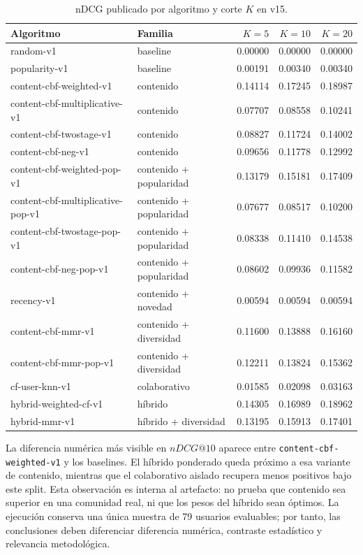 \begin{table}[htbp]
\centering
\caption{nDCG publicado por algoritmo y corte $K$ en v15.}\label{tab:ndcg-todos-k}
\tablecompact
\begin{tabularx}{\textwidth}{@{}>{\ttfamily\raggedright\arraybackslash}p{}Yrrr@{}}
\textnormal{Algoritmo} & \textnormal{Familia} & \textnormal{$K=5$} & \textnormal{$K=10$} & \textnormal{$K=20$} \\
\hline
random-v1 & baseline & 0.00000 & 0.00000 & 0.00000 \\
popularity-v1 & baseline & 0.00191 & 0.00340 & 0.00340 \\
content-cbf-weighted-v1 & contenido & 0.14114 & 0.17245 & 0.18987 \\
content-cbf-multiplicative-v1 & contenido & 0.07707 & 0.08558 & 0.10241 \\
content-cbf-twostage-v1 & contenido & 0.08827 & 0.11724 & 0.14002 \\
content-cbf-neg-v1 & contenido & 0.09656 & 0.11778 & 0.12992 \\
content-cbf-weighted-pop-v1 & contenido + popularidad & 0.13179 & 0.15181 & 0.17409 \\
content-cbf-multiplicative-pop-v1 & contenido + popularidad & 0.07677 & 0.08517 & 0.10200 \\
content-cbf-twostage-pop-v1 & contenido + popularidad & 0.08338 & 0.11410 & 0.14538 \\
content-cbf-neg-pop-v1 & contenido + popularidad & 0.08602 & 0.09936 & 0.11582 \\
recency-v1 & contenido + novedad & 0.00594 & 0.00594 & 0.00594 \\
content-cbf-mmr-v1 & contenido + diversidad & 0.11600 & 0.13888 & 0.16160 \\
content-cbf-mmr-pop-v1 & contenido + diversidad & 0.12211 & 0.13824 & 0.15362 \\
cf-user-knn-v1 & colaborativo & 0.01585 & 0.02098 & 0.03163 \\
hybrid-weighted-cf-v1 & híbrido & 0.14305 & 0.16989 & 0.18962 \\
hybrid-mmr-v1 & híbrido + diversidad & 0.13195 & 0.15913 & 0.17401 \\
\end{tabularx}
\end{table}

La diferencia numérica más visible en \(nDCG@10\) aparece entre \texttt{content-cbf-weighted-v1} y los baselines. El híbrido ponderado queda próximo a esa variante de contenido, mientras que el colaborativo aislado recupera menos positivos bajo este split. Esta observación es interna al artefacto: no prueba que contenido sea superior en una comunidad real, ni que los pesos del híbrido sean óptimos. La ejecución conserva una única muestra de 79 usuarios evaluables; por tanto, las conclusiones deben diferenciar diferencia numérica, contraste estadístico y relevancia metodológica.

